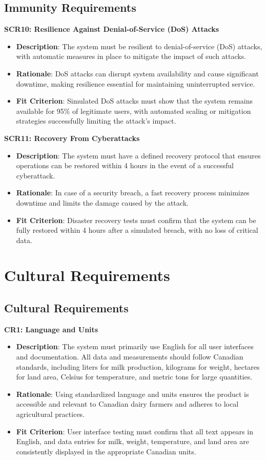 \documentclass[12pt]{article}
\begin{document}
\subsection{Immunity Requirements}
\textbf{SCR10: Resilience Against Denial-of-Service (DoS) Attacks}
\begin{itemize}
    \item \textbf{Description}: The system must be resilient to denial-of-service
    (DoS) attacks, with automatic measures in place to mitigate the impact of
    such attacks.
    \item \textbf{Rationale}: DoS attacks can disrupt system availability and
    cause significant downtime, making resilience essential for maintaining
    uninterrupted service.
    \item \textbf{Fit Criterion}: Simulated DoS attacks must show that the
    system remains available for 95\% of legitimate users, with automated
    scaling or mitigation strategies successfully limiting the attack's impact.
\end{itemize}
\textbf{SCR11: Recovery From Cyberattacks}
\begin{itemize}
    \item \textbf{Description}: The system must have a defined recovery protocol
    that ensures operations can be restored within 4 hours in the event of a
    successful cyberattack.
    \item \textbf{Rationale}: In case of a security breach, a fast recovery
    process minimizes downtime and limits the damage caused by the attack.
    \item \textbf{Fit Criterion}: Disaster recovery tests must confirm that the
    system can be fully restored within 4 hours after a simulated breach, with
    no loss of critical data.
\end{itemize}


\section{Cultural Requirements}
\subsection{Cultural Requirements}
\textbf{CR1: Language and Units}
\begin{itemize}
    \item \textbf{Description}: The system must primarily use English for all
    user interfaces and documentation. All data and measurements should follow
    Canadian standards, including liters for milk production, kilograms for
    weight, hectares for land area, Celsius for temperature, and metric tons for
    large quantities.
    \item \textbf{Rationale}: Using standardized language and units ensures the
    product is accessible and relevant to Canadian dairy farmers and adheres to
    local agricultural practices.
    \item \textbf{Fit Criterion}: User interface testing must confirm that all
    text appears in English, and data entries for milk, weight, temperature, and
    land area are consistently displayed in the appropriate Canadian units.
\end{itemize}
\end{document}
